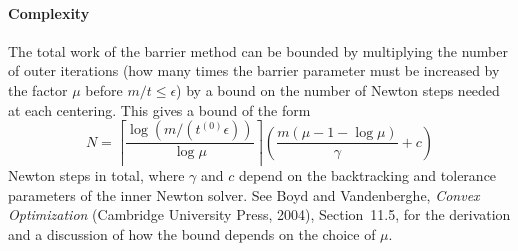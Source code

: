 \paragraph{Complexity} The total work of the barrier method can be bounded by multiplying the number of outer iterations (how many times the barrier parameter must be increased by the factor $\mu$ before $m/t \leq \epsilon$) by a bound on the number of Newton steps needed at each centering. This gives a bound of the form
\[
N=\left\lceil\frac{\log \left(m /\left(t^{(0)} \epsilon\right)\right)}{\log \mu}\right\rceil\left(\frac{m(\mu-1-\log \mu)}{\gamma}+c\right)
\]
Newton steps in total, where $\gamma$ and $c$ depend on the backtracking and tolerance parameters of the inner Newton solver. See Boyd and Vandenberghe, \emph{Convex Optimization} (Cambridge University Press, 2004), Section~11.5, for the derivation and a discussion of how the bound depends on the choice of $\mu$.


